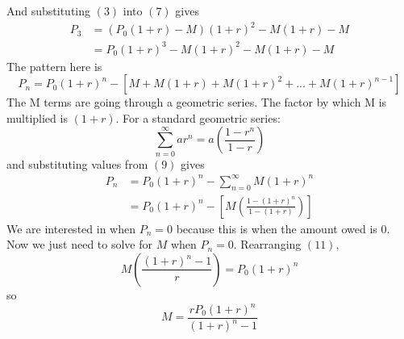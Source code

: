 \documentclass{article}
\begin{document}
\begin{flushleft}
\begin{equation}
\end{equation}
And substituting $(3)$ into $(7)$ gives
\begin{equation}
\begin{aligned}
P_3 & = (P_0 (1 + r) - M)(1 + r)^2 - M(1 + r) - M \\
& = P_0 (1 + r)^3 - M(1 + r)^2 - M(1 + r) - M
\end{aligned}
\end{equation}
The pattern here is 
\begin{equation}
P_n = P_0 (1 + r)^n - [M + M(1 + r) + M( 1 + r)^2 + ... + M(1 + r)^{n - 1}]
\end{equation}
The M terms are going through a geometric series. The factor by which M is multiplied is $(1 + r)$. For a standard geometric series:
\begin{equation}
\sum_{n = 0}^{\infty} ar^n = a \left( \frac{1 - r^n}{1 - r} \right)
\end{equation} 
and substituting values from $(9)$ gives
\begin{equation}
\begin{aligned}
P_n & = P_0 (1 + r)^n - \sum_{n=0}^{\infty} M(1 + r)^n \\
& = P_0 (1 + r)^n - \left[ M \left( \frac{1 - (1 + r)^n}{1 - (1 + r)} \right) \right]
\end{aligned}
\end{equation}
We are interested in when $P_n = 0$ because this is when the amount owed is 0. Now we just need to solve for $M$ when $P_n = 0$. Rearranging $(11)$,
\begin{equation}
M \left( \frac{(1 + r)^n - 1}{r}\right) = P_0 (1 + r)^n
\end{equation}
so
\begin{equation}
\boxed {
M = \frac{r P_0 (1 + r)^n}{(1 + r)^n - 1}
}
\end{equation}
\end{flushleft}
\end{document}
